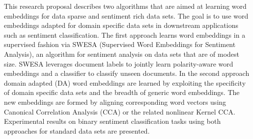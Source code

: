 This research proposal describes two algorithms that are aimed at learning word embeddings for data sparse and sentiment rich data sets. The goal is to use word embeddings adapted for domain specific data sets in downstream applications such as sentiment classification. The first approach learns word embeddings in a supervised fashion via SWESA (Supervised Word Embeddings for Sentiment Analysis), an algorithm for sentiment analysis on data sets that are of modest size. SWESA leverages document labels to jointly learn polarity-aware word embeddings and a classifier to classify unseen documents. In the second approach domain adapted (DA) word embeddings are learned by exploiting the specificity of domain specific data sets and the breadth of generic word embeddings. The new embeddings are formed by aligning corresponding word vectors using Canonical Correlation Analysis (CCA) or the related nonlinear Kernel CCA. Experimental results on binary sentiment classification tasks using both approaches for standard data sets are presented.
